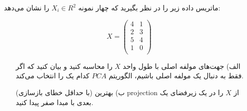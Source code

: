 

ماتریس داده زیر را در نظر  بگیرید که چهار نمونه $X_i \in R^2$ را نشان می‌دهد:

$$X= \begin{pmatrix}
 4 & 1  \\
 2& 3 \\
 5& 4 \\
 1& 0  \\
\end{pmatrix}$$

\begin{enumerate}
    \item [الف)] جهت‌های مولفه اصلی با طول واحد $X$ را محاسبه کنید و بیان کنید که اگر فقط به دنبال یک مولفه اصلی باشیم،  الگوریتم $PCA$ کدام یک را انتخاب می‌کند. 
    \item[ب)] بهترین (با حداقل خطای بازسازی) projection از $X$ را در یک زیرفضای یک بعدی با مبدا صفر پیدا کنید.
\end{enumerate}

